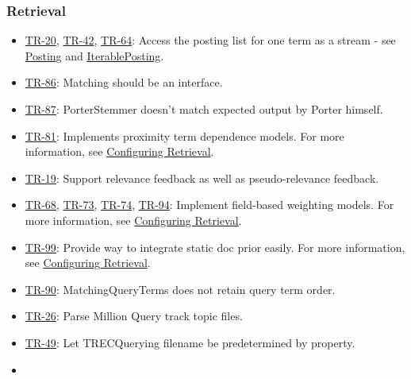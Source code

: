 \subsubsection{Retrieval}\label{retrieval-4}

\begin{itemize}
\tightlist
\item
  \href{http://terrier.org/issues/browse/TR-20}{TR-20},
  \href{http://terrier.org/issues/browse/TR-42}{TR-42},
  \href{http://terrier.org/issues/browse/TR-64}{TR-64}: Access the
  posting list for one term as a stream - see
  \href{javadoc/org/terrier/structures/postings/Posting.html}{Posting}
  and
  \href{javadoc/org/terrier/structures/postings/IterablePosting.html}{IterablePosting}.
\item
  \href{http://terrier.org/issues/browse/TR-86}{TR-86}: Matching should
  be an interface.
\item
  \href{http://terrier.org/issues/browse/TR-87}{TR-87}: PorterStemmer
  doesn't match expected output by Porter himself.
\item
  \href{http://terrier.org/issues/browse/TR-81}{TR-81}: Implements
  proximity term dependence models. For more information, see
  \href{configure_retrieval.html\#proximity}{Configuring Retrieval}.
\item
  \href{http://terrier.org/issues/browse/TR-19}{TR-19}: Support
  relevance feedback as well as pseudo-relevance feedback.
\item
  \href{http://terrier.org/issues/browse/TR-68}{TR-68},
  \href{http://terrier.org/issues/browse/TR-73}{TR-73},
  \href{http://terrier.org/issues/browse/TR-73}{TR-74},
  \href{http://terrier.org/issues/browse/TR-94}{TR-94}: Implement
  field-based weighting models. For more information, see
  \href{configure_retrieval.html\#fields}{Configuring Retrieval}.
\item
  \href{http://terrier.org/issues/browse/TR-99}{TR-99}: Provide way to
  integrate static doc prior easily. For more information, see
  \href{configure_retrieval.html\#priors}{Configuring Retrieval}.
\item
  \href{http://terrier.org/issues/browse/TR-90}{TR-90}:
  MatchingQueryTerms does not retain query term order.
\item
  \href{http://terrier.org/issues/browse/TR-26}{TR-26}: Parse Million
  Query track topic files.
\item
  \href{http://terrier.org/issues/browse/TR-49}{TR-49}: Let TRECQuerying
  filename be predetermined by property.
\item

\end{itemize}
